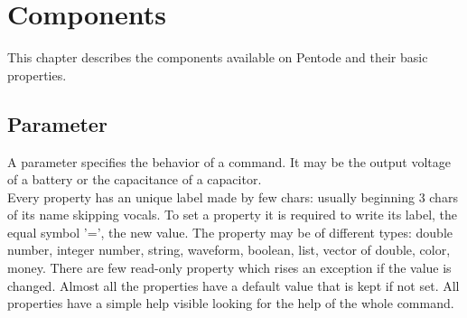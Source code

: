 \documentclass[12pt,a4paper]{book}
\begin{document}
\chapter{Components}
This chapter describes the components available on Pentode and their basic properties.\\
\section{Parameter}
A parameter specifies the behavior of a command. It may be the output voltage of a battery or the capacitance of a capacitor.\\ 
Every property has an unique label made by few chars: usually beginning 3 chars of its name skipping vocals. To set a property it is required to write its label, the equal symbol '=', the new value. The property may be of different types: double number, integer number, string, waveform, boolean, list, vector of double, color, money. There are few read-only property which rises an exception if the value is changed. Almost all the properties have a default value that is kept if not set. All properties have a simple help visible looking for the help of the whole command.\\
\end{document}
